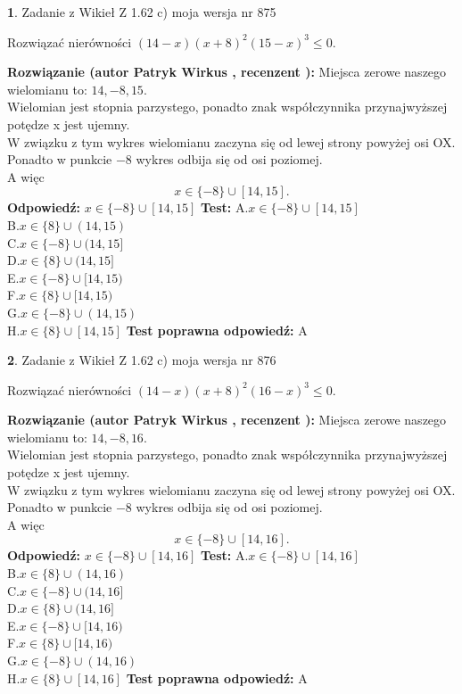 \documentclass[12pt, a4paper]{article}
\theoremstyle{definition} %
\newtheorem{zad}{}
\newcommand{\zadStart}[1]{\begin{zad}#1\newline}
\newcommand{\zadStop}{\end{zad}}
\newcommand{\rozwStart}[2]{\noindent \textbf{Rozwiązanie (autor #1 , recenzent #2): }\newline}
\newcommand{\rozwStop}{\newline}
\newcommand{\odpStart}{\noindent \textbf{Odpowiedź:}\newline}
\newcommand{\odpStop}{\newline}
\newcommand{\testStart}{\noindent \textbf{Test:}\newline}
\newcommand{\testStop}{\newline}
\newcommand{\kluczStart}{\noindent \textbf{Test poprawna odpowiedź:}\newline}
\newcommand{\kluczStop}{\newline}
\begin{document}
\zadStart{Zadanie z Wikieł Z 1.62 c) moja wersja nr 875}

Rozwiązać nierówności $(14-x)(x+8)^{2}(15-x)^{3}\le0$.
\zadStop
\rozwStart{Patryk Wirkus}{}
Miejsca zerowe naszego wielomianu to: $14, -8, 15$.\\
Wielomian jest stopnia parzystego, ponadto znak współczynnika przy\linebreak najwyższej potędze x jest ujemny.\\ W związku z tym wykres wielomianu zaczyna się od lewej strony powyżej osi OX.\\
Ponadto w punkcie $-8$ wykres odbija się od osi poziomej.\\
A więc $$x \in \{-8\} \cup [14,15].$$
\rozwStop
\odpStart
$x \in \{-8\} \cup [14,15]$
\odpStop
\testStart
A.$x \in \{-8\} \cup [14,15]$\\
B.$x \in \{8\} \cup (14,15)$\\
C.$x \in \{-8\} \cup (14,15]$\\
D.$x \in \{8\} \cup (14,15]$\\
E.$x \in \{-8\} \cup [14,15)$\\
F.$x \in \{8\} \cup [14,15)$\\
G.$x \in \{-8\} \cup (14,15)$\\
H.$x \in \{8\} \cup [14,15]$
\testStop
\kluczStart
A
\kluczStop



\zadStart{Zadanie z Wikieł Z 1.62 c) moja wersja nr 876}

Rozwiązać nierówności $(14-x)(x+8)^{2}(16-x)^{3}\le0$.
\zadStop
\rozwStart{Patryk Wirkus}{}
Miejsca zerowe naszego wielomianu to: $14, -8, 16$.\\
Wielomian jest stopnia parzystego, ponadto znak współczynnika przy\linebreak najwyższej potędze x jest ujemny.\\ W związku z tym wykres wielomianu zaczyna się od lewej strony powyżej osi OX.\\
Ponadto w punkcie $-8$ wykres odbija się od osi poziomej.\\
A więc $$x \in \{-8\} \cup [14,16].$$
\rozwStop
\odpStart
$x \in \{-8\} \cup [14,16]$
\odpStop
\testStart
A.$x \in \{-8\} \cup [14,16]$\\
B.$x \in \{8\} \cup (14,16)$\\
C.$x \in \{-8\} \cup (14,16]$\\
D.$x \in \{8\} \cup (14,16]$\\
E.$x \in \{-8\} \cup [14,16)$\\
F.$x \in \{8\} \cup [14,16)$\\
G.$x \in \{-8\} \cup (14,16)$\\
H.$x \in \{8\} \cup [14,16]$
\testStop
\kluczStart
A
\kluczStop
\end{document}
